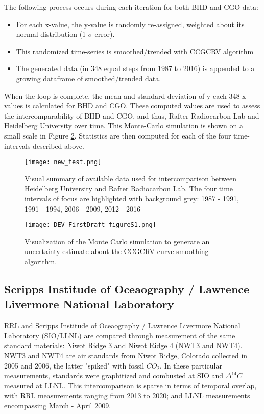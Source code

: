 \documentclass{article}
\begin{document}
The following process occurs during each iteration for both BHD and CGO data: 
\begin{itemize}
	\item For each x-value, the y-value is  randomly re-assigned, weighted about its normal distribution (1-${\sigma}$ error). 
	\item This randomized time-series is smoothed/trended with CCGCRV algorithm 
	\item The generated data (in 348 equal steps from 1987 to 2016) is appended to a growing dataframe of smoothed/trended data.
\end{itemize}
When the loop is complete, the mean and standard deviation of y each 348 x-values is calculated for BHD and CGO. These computed values are used to assess the intercomparability of BHD and CGO, and thus, Rafter Radiocarbon Lab and Heidelberg University over time. This Monte-Carlo simulation is shown on a small scale in Figure \ref{fig:montecarloexplained}. Statistics are then computed for each of the four time-intervals described above. 



\begin{figure}[h!]
  \centering
  \texttt{[image: new\_test.png]}
  \caption{Visual summary of available data used for intercomparison between Heidelberg University and Rafter Radiocarbon Lab. The four time intervals of focus are highlighted with background grey: 1987 - 1991, 1991 - 1994, 2006 - 2009, 2012 - 2016 }
  \label{fig:4timeintervals}
\end{figure}

\begin{figure}[htp]
    \centering
    \texttt{[image: DEV\_FirstDraft\_figureS1.png]}
    \caption{Visualization of the Monte Carlo simulation to generate an uncertainty estimate about the CCGCRV curve smoothing algorithm.}
    \label{fig:montecarloexplained}
\end{figure}

\subsection{Scripps Institude of Oceaography / Lawrence Livermore National Laboratory}

RRL and Scripps Institude of Oceaography / Lawrence Livermore National Laboratory (SIO/LLNL) are compared through measurement of the same standard materials: Niwot Ridge 3 and Niwot Ridge 4 (NWT3 and NWT4). NWT3 and NWT4 are air standards from Niwot Ridge, Colorado collected in 2005 and 2006, the latter "spiked" with fossil ${CO_{2}}$. In these particular measurements, standards were graphitized and combusted at SIO and ${\Delta^{14}C}$ measured at LLNL. This intercomparison is sparse in terms of temporal overlap, with RRL measurements ranging from 2013 to 2020; and LLNL measurements encompassing March - April 2009. 
\end{document}
